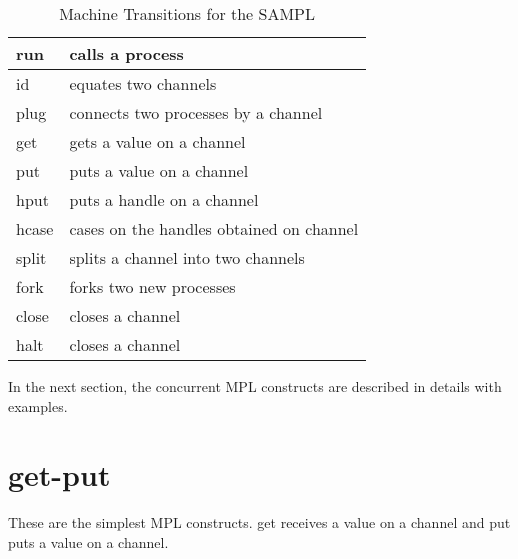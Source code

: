 \documentclass[11pt]{article}
\newcommand{\<}{\langle}
\renewcommand{\>}{\rangle}
\begin{document}
\begin{table}[!h]
\begin{center}
    \begin{tabular}{|l||l|}
    \hline 
        {\sf run} & calls a process \\ \hline 
        {\sf id}  & equates two channels \\ \hline 
        {\sf plug} & connects two processes by a channel \\ \hline  
        {\sf get} & gets a value on a channel \\ \hline 
        {\sf put} & puts a value on a channel \\ \hline 
        {\sf hput} & puts a handle on a channel \\ \hline 
        {\sf hcase} & cases on the handles obtained on channel \\ \hline 
        {\sf split} & splits a channel into two channels \\ \hline 
        {\sf fork} & forks two new processes \\ \hline 
        {\sf close} & closes a channel \\ \hline 
        {\sf halt} & closes a channel \\ \hline
   \end{tabular}
\caption{Machine Transitions for the SAMPL}
\label{AMPL:TranSeqTable}
\end{center}
\end{table}

In the next section, the concurrent MPL constructs are described in details with examples.

\section{get-put}
These are the simplest MPL constructs. {\sf get} receives a value on a channel and {\sf put} puts a value on a channel.
\end{document}
